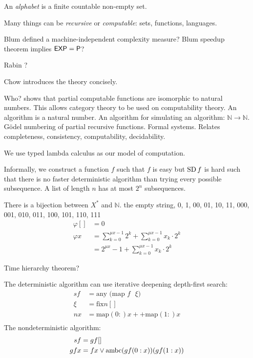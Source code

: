 An \emph{alphabet} is a finite countable non-empty set.

Many things can be \emph{recursive} or \emph{computable}: sets, functions, languages.

Blum \cite{Blum1967} defined a machine-independent complexity measure?
Blum speedup theorem implies $\mathsf{EXP} = \mathsf{P}$?

Rabin \cite{Rabin1977}?

Chow \cite{Chow1976} introduces the theory concisely.

Who? shows that partial computable functions are isomorphic to natural numbers.
This allows category theory to be used on computability theory.
An algorithm is a natural number.
An algorithm for simulating an algorithm: $\mathbb N \to \mathbb N$.
G\"odel numbering of partial recursive functions.
Formal systems.
Relates completeness, consistency, computability, decidability.

We use typed lambda calculus as our model of computation.

Informally, we construct a function $f$ such that $f$ is easy but $\operatorname{SD} f$ is hard
such that there is no faster deterministic algorithm
than trying every possible subsequence.
A list of length $n$ has at most $2^n$ subsequences.

There is a bijection between $X^*$ and $\mathbb N$.
the empty string, 0, 1, 00, 01, 10, 11, 000, 001, 010, 011, 100, 101, 110, 111
\begin{align}
    \varphi [] &= 0
  \\ \varphi x &= \sum_{k=0}^{\mu x - 1} 2^k + \sum_{k=0}^{\mu x - 1} x_k \cdot 2^k
            \\ &= 2^{\mu x} - 1 + \sum_{k=0}^{\mu x - 1} x_k \cdot 2^k
\end{align}

Time hierarchy theorem?

The deterministic algorithm can use iterative deepening depth-first search:
\begin{align}
    sf &= \text{any $($map $f$ $\xi)$}
    \\
    \xi &= \text{fix} n []
    \\
    nx &= \text{map} (0:) x ++ \text{map} (1:) x
    \\
\end{align}
The nondeterministic algorithm:
\begin{align}
    sf &= gf[]
    \\
    gfx &= fx \vee \operatorname{ambc} (gf(0:x)) (gf(1:x))
\end{align}


